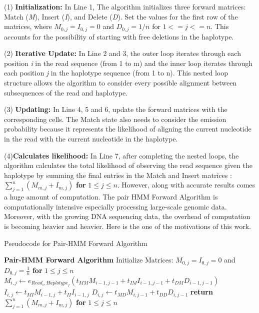 \documentclass[PhD]{PHlab-thesis}
\begin{document}
(1) \textbf{Initialization:} In Line 1, The algorithm initializes three forward matrices: Match (\textit{M}), Insert (\textit{I}), and Delete (\textit{D}). Set the values for the first row of the matrices, where $M_{0,j}= I_{0,j} = 0 $ and $D_{0,j} = 1 / n $ for $1 <= j <= n$. This accounts for the possibility of starting with free deletions in the haplotype. 

(2) \textbf{Iterative Update:} In Line 2 and 3, the outer loop iterates through each position \textit{i} in the read sequence (from 1 to m) and the inner loop iterates through each position \textit{j} in the haplotype sequence (from 1 to n). This nested loop structure allows the algorithm to consider every possible alignment between subsequences of the read and haplotype.

(3) \textbf{Updating:} In Line 4, 5 and 6, update the forward matrices with the corresponding cells. The Match state also needs to consider the emission probability because it represents the likelihood of aligning the current nucleotide in the read with the current nucleotide in the haplotype. 

(4)\textbf{Calculates likelihood:} In Line 7, after completing the nested loops, the algorithm calculates the total likelihood of observing the read sequence given the haplotype by summing the final entries in the Match and Insert matrices : $\sum_{j=1}^{n} (M_{m,j} + I_{m,j})$ \textbf{for} $1 \leq j \leq n$.\newline
However, along with accurate results comes a huge amount of computation. The pair HMM Forward Algorithm is computationally intensive especially  processing large-scale genomic data. Moreover, with the growing DNA sequencing data, the overhead of computation is becoming heavier and heavier. Here is the one of the motivations of this work.\newline

\begin{algorithm}
\caption{Pseudocode for Pair-HMM Forward Algorithm}
\begin{algorithmic}[1]
\Procedure\textbf{Pair-HMM Forward Algorithm}
\State Initialize Matrices: $M_{0,j} = I_{0,j} = 0$ and $D_{0,j} = \frac{1}{n}$ \textbf{for} $1 \leq j \leq n$
        \State $M_{i,j} \gets e_{Read_{i},Haplotype_{j}} (t_{MM} M_{i-1,j-1}  + t_{IM} I_{i-1,j-1}  +  t_{DM} D_{i-1,j-1})$
        \State $I_{i,j} \gets t_{MI} M_{i-1,j}  + t_{II} I_{i-1,j} $
        \State $D_{i,j} \gets t_{MD} M_{i,j-1} + t_{DD} D_{i,j-1} $
    \EndFor
\EndFor
\State \textbf{return }$\sum_{j=1}^{n} (M_{m,j} + I_{m,j})$ \textbf{for} $1 \leq j \leq n$
\EndProcedure
\end{algorithmic}
\end{algorithm}
\end{document}

